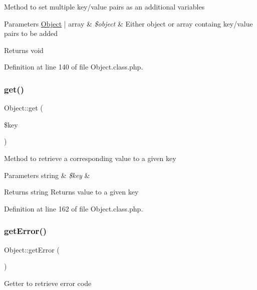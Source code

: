 Method to set multiple key/value pairs as an additional variables


\begin{DoxyParams}[1]{Parameters}
\hyperlink{classObject}{Object} | array & {\em \$object} & Either object or array containg key/value pairs to be added \\
\hline
\end{DoxyParams}
\begin{DoxyReturn}{Returns}
void 
\end{DoxyReturn}


Definition at line 140 of file Object.\+class.\+php.

\hypertarget{classObject_ae6dff49b7ab68822bdb4ce6940c10d3f}{}\label{classObject_ae6dff49b7ab68822bdb4ce6940c10d3f} 
\subsubsection{\texorpdfstring{get()}{get()}}
{\footnotesize\ttfamily Object\+::get (\begin{DoxyParamCaption}\item[{}]{\$key }\end{DoxyParamCaption})}

Method to retrieve a corresponding value to a given key


\begin{DoxyParams}[1]{Parameters}
string & {\em \$key} & \\
\hline
\end{DoxyParams}
\begin{DoxyReturn}{Returns}
string Returns value to a given key 
\end{DoxyReturn}


Definition at line 162 of file Object.\+class.\+php.

\hypertarget{classObject_a2aaced460a018edd69bf17813d6c48df}{}\label{classObject_a2aaced460a018edd69bf17813d6c48df} 
\subsubsection{\texorpdfstring{get\+Error()}{getError()}}
{\footnotesize\ttfamily Object\+::get\+Error (\begin{DoxyParamCaption}{ }\end{DoxyParamCaption})}

Getter to retrieve error code

